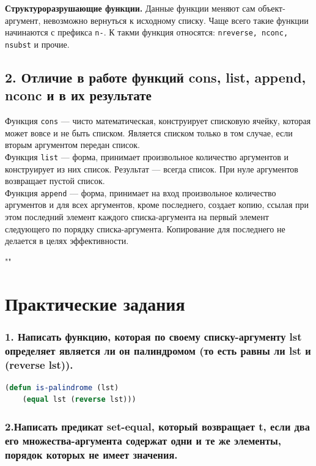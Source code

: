 \documentclass[12pt]{report}
\begin{document}
\indent \textbf{Структуроразрушающие функции.} Данные функции меняют сам объект-аргумент, невозможно вернуться к исходному списку. Чаще всего такие функции начинаются с префикса \texttt{n-}. К такми функция относятся: \texttt{nreverse, nconc, nsubst} и прочие.\\



\section*{2. Отличие в работе функций cons, list, append, nconc и в их результате}

Функция \texttt{cons} --- чисто математическая, конструирует списковую ячейку, которая может вовсе и не быть списком. Является списком только в том случае, если вторым аргументом передан список.\\

Функция \texttt{list} --- форма, принимает произвольное количество аргументов и конструирует из них список. Результат --- всегда список. При нуле аргументов возвращает пустой список.\\

Функция \texttt{append} --- форма, принимает на вход произвольное количество аргументов и для всех аргументов, кроме последнего, создает копию, ссылая при этом последний элемент каждого списка-аргумента на первый элемент следующего по порядку списка-аргумента. Копирование для последнего не делается в целях эффективности.



""\newline
\chapter*{Практические задания}

\subsection*{1. Написать функцию, которая по своему списку-аргументу lst определяет
	является ли он палиндромом (то есть равны ли lst и (reverse lst)).}

\begin{lstlisting}[label=6xd, caption=Решение задания №1, language=lisp]
(defun is-palindrome (lst)
	(equal lst (reverse lst)))

\end{lstlisting}

\subsection*{2.Написать предикат set-equal, который возвращает t, если два его множества-аргумента содержат одни и те же элементы, порядок которых не имеет значения.}
\end{document}
